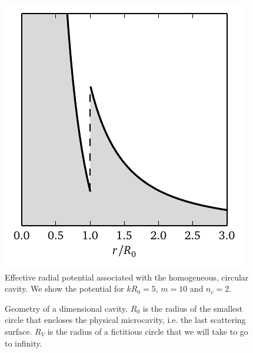 \begin{figure}
	\centering
	\includegraphics{figs/passive/quantumPotential.pdf}
	\caption[Effective radial potential associated with the homogeneous, circular cavity]
			{Effective radial potential associated with the homogeneous, circular cavity.
			We show the potential for $kR_0=5$, $m=10$ and $n_c=2$.}
	\label{fig:passive.formalism.quantumConnection}
\end{figure}

\begin{figure}
 \centering
 \def\svgwidth{0.4\textwidth}
 
 \caption[Geometry of a bidimensional cavity]
	 {Geometry of a dimensional cavity. $R_0$ is the radius of the smallest circle
	 that encloses the physical microcavity, i.e. the last scattering surface. 
	 $R_V$ is the radius of a fictitious circle
	 that we will take to go to infinity.}
\label{fig:passive.formalism.geometry}
\end{figure}

